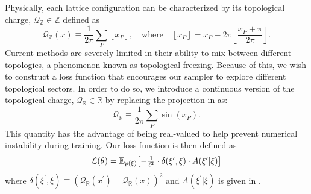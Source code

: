 \documentclass{article} %
\begin{document}
Physically, each lattice configuration can be characterized by its topological charge, \(\mathcal{Q}_{\mathbb{Z}}\in\mathbb{Z}\) defined as
%
\begin{equation*}
      \mathcal{Q}_{\mathbb{Z}}(x) \equiv \frac{1}{2\pi}\sum_{P}\left\lfloor x_{P}\right\rfloor,
   \quad\text{where}\quad \left\lfloor x_{P}\right\rfloor = x_{P} -
   2\pi\left\lfloor\frac{x_{P}+\pi}{2\pi}\right\rfloor.
   \label{eq:intcharge}
\end{equation*}
%
Current methods are severely limited in their ability to mix between different topologies, a phenomenon known as topological freezing.
%
Because of this, we wish to construct a loss function that encourages our sampler to explore different topological sectors.
%
In order to do so, we introduce a continuous version of the topological charge, \(\mathcal{Q}_{\mathbb{R}}\in\mathbb{R}\) by replacing the projection in  as:
%
\begin{equation}
    \mathcal{Q}_{\mathbb{R}} \equiv \frac{1}{2\pi}\sum_{P}\sin(x_{P}).
    \label{eq:sincharge}
\end{equation}
%
This quantity has the advantage of being real-valued to help prevent numerical instability during training.
%
Our loss function is then defined as
%
\begin{equation}
   \mathcal{L}(\theta) = \mathbb{E}_{p(\xi)}{%
      \left[-\tfrac{1}{\ell^{2}}\cdot\delta(\xi^{\prime}, \xi)\cdot A(\xi^{\prime}|\xi)\right]
   }
\end{equation}
%
where \(\delta(\xi^{\prime}, \xi) \equiv {\left(\mathcal{Q}_{\mathbb{R}}(x^{\prime}) - \mathcal{Q}_{\mathbb{R}}(x)\right)}^{2}\) and \(A(\xi^{\prime}|\xi)\) is given in .
%
\end{document}
